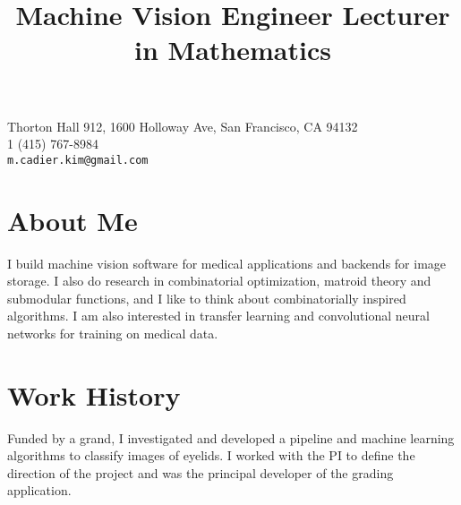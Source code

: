 \documentclass[margin,line,pifont,palatino,courier]{res}
\begin{document}


\begin{resume}




\begin{flushright}
{\small
Thorton Hall 912, 1600 Holloway Ave, San Francisco, CA 94132 \\
1 (415) 767-8984\\
  \verb+m.cadier.kim@gmail.com+
}
\end{flushright}
 
\section{\sc  About Me}
    
      
          
            I build machine vision software for medical applications and backends for image storage. I also do research in combinatorial optimization, matroid theory and submodular functions, and I like to think about combinatorially inspired algorithms.  I am also interested in transfer learning and convolutional neural networks for training on medical data.

          
      
          
      
          
      
          
      


\section{\sc  Work History}
  
  
    \title{ Machine Vision Engineer   }

    \begin{position}
    Funded by a grand, I investigated and developed a pipeline and machine learning algorithms to classify images of eyelids. I worked with the PI to define the direction of the project and was the principal developer of the grading application.
    \end{position}
  
    \title{ Lecturer in Mathematics  }


\end{resume}
\end{document}
